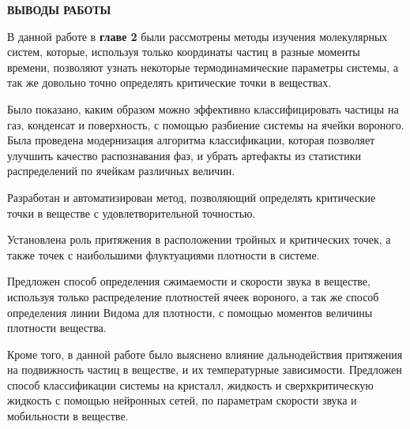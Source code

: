 \newpage
\begin{center}
\textbf{ВЫВОДЫ РАБОТЫ}
\end{center}



В данной работе в \textbf{главе 2} были рассмотрены методы изучения молекулярных систем, которые, используя только координаты частиц в разные моменты времени, позволяют узнать некоторые термодинамические параметры системы, а так же довольно точно определять критические точки в веществах. 

Было показано, каким образом можно эффективно классифицировать частицы на газ, конденсат и поверхность, с помощью разбиение системы на ячейки вороного. Была проведена модернизация алгоритма классификации, которая позволяет улучшить качество распознавания фаз, и убрать артефакты из статистики распределений по ячейкам различных величин.

Разработан и автоматизирован метод, позволяющий определять критические точки в веществе с удовлетворительной точностью.

Установлена роль притяжения в расположении тройных и критических точек, а также точек с наибольшими флуктуациями плотности в системе.

Предложен способ определения сжимаемости и скорости звука в веществе, используя только распределение плотностей ячеек вороного, а так же способ определения линии Видома для плотности, с помощью моментов величины плотности вещества.

Кроме того, в данной работе было выяснено влияние дальнодействия притяжения на подвижность частиц в веществе, и их температурные зависимости. Предложен способ классификации системы на кристалл, жидкость и сверхкритическую жидкость с помощью нейронных сетей, по параметрам скорости звука и мобильности в веществе.
